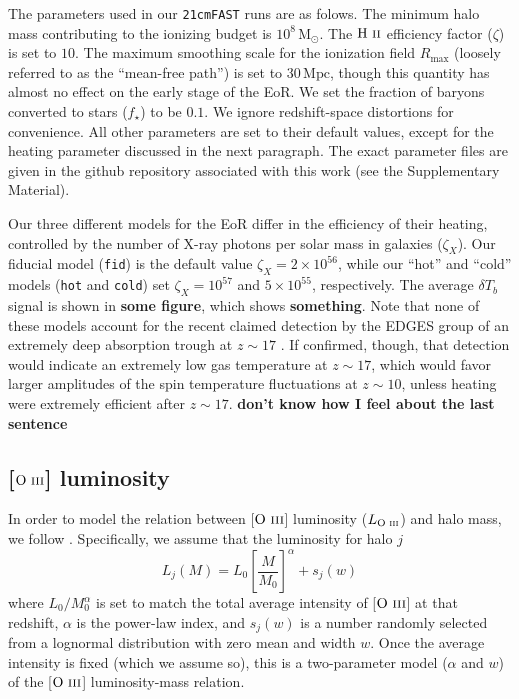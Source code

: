 \documentclass[a4paper,fleqn,usenatbib]{mnras}
\newcommand{\beq}{\begin{equation}}
\newcommand{\eeq}{\end{equation}}
\newcommand{\tfast}{\texttt{21cmFAST}}
\newcommand{\HII}{\ensuremath{\text{H~\textsc{ii}}}}
\newcommand{\OIII}{\ensuremath{\text{O~\textsc{iii}}}}
\newcommand{\Msun}{\ensuremath{\text{M}_\odot}}
\newcommand{\Mpc}{\ensuremath{\text{Mpc}}}
\newcommand{\fid}{\texttt{fid}}
\newcommand{\hot}{\texttt{hot}}
\newcommand{\cold}{\texttt{cold}}
\begin{document}
The parameters used in our \tfast{} runs are as folows. The minimum halo mass
contributing to the ionizing budget is $10^{8}\,\Msun$. The \HII{} efficiency
factor ($\zeta$) is set to $10$. The maximum smoothing scale for the
ionization field $R_{\text{max}}$ (loosely referred to as the ``mean-free
path'') is set to $30\,\Mpc$, though this quantity has almost no effect on the
early stage of the EoR. We set the fraction of baryons converted to stars
($f_\star$) to be $0.1$. We ignore redshift-space distortions for convenience.
All other parameters are set to their default values, except for the heating
parameter discussed in the next paragraph. The exact parameter files are given
in the github repository associated with this work (see the Supplementary
Material).

Our three different models for the EoR differ in the efficiency of their
heating, controlled by the number of X-ray photons per solar mass in galaxies
($\zeta_X$). Our fiducial model (\fid{}) is the default value
$\zeta_X=2\times10^{56}$, while our ``hot'' and ``cold'' models (\hot{} and
\cold{}) set $\zeta_X=10^{57}$ and $5\times10^{55}$, respectively. The average
$\delta T_b$ signal is shown in \textbf{some figure}, which shows
\textbf{something}. Note that none of these models account for the recent
claimed detection by the EDGES group of an extremely deep absorption trough at
$z\sim17$ \citep{2018Natur.555...67B}. If confirmed, though, that detection
would indicate an extremely low gas temperature at $z\sim17$, which would
favor larger amplitudes of the spin temperature fluctuations at $z\sim10$,
unless heating were extremely efficient after $z\sim17$. {\bf don't know how I
feel about the last sentence}



\subsection{[\OIII] luminosity} \label{ssec:oiii_lum}


In order to model the relation between [\OIII] luminosity ($L_{\OIII}$) and
halo mass, we follow \citet{2019ApJ...874..133B}. Specifically, we assume that
the luminosity for halo $j$
\beq \label{eq:lum_mass_relation}
L_j(M) = L_0 \left[ \frac{M}{M_0} \right]^{\alpha} + s_j(w)
\eeq
where $L_0/M_0^{\alpha}$ is set to match the total average intensity of
[\OIII] at that redshift, $\alpha$ is the power-law index, and $s_j(w)$ is a
number randomly selected from a lognormal distribution with zero mean and
width $w$. Once the average intensity is fixed (which we assume so), this is a
two-parameter model ($\alpha$ and $w$) of the [\OIII] luminosity-mass
relation.
\end{document}
